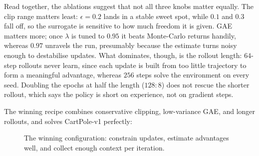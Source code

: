 \documentclass{article}
\begin{document}
Read together, the ablations suggest that not all three knobs matter equally. The clip range matters least: $\epsilon=0.2$ lands in a stable sweet spot, while $0.1$ and $0.3$ fall off, so the surrogate is sensitive to how much freedom it is given. GAE matters more; once $\lambda$ is tuned to $0.95$ it beats Monte-Carlo returns handily, whereas $0.97$ unravels the run, presumably because the estimate turns noisy enough to destabilise updates. What dominates, though, is the rollout length: $64$-step rollouts never learn, since each update is built from too little trajectory to form a meaningful advantage, whereas $256$ steps solve the environment on every seed. Doubling the epochs at half the length ($128{:}8$) does not rescue the shorter rollout, which says the policy is short on experience, not on gradient steps.

The winning recipe combines conservative clipping, low-variance GAE, and longer rollouts, and solves CartPole-v1 perfectly:

\begin{figure}[H]
  \centering
  \caption{The winning configuration: constrain updates, estimate advantages well, and collect enough context per iteration.}
  \label{fig:winning-recipe}
\end{figure}
\end{document}
